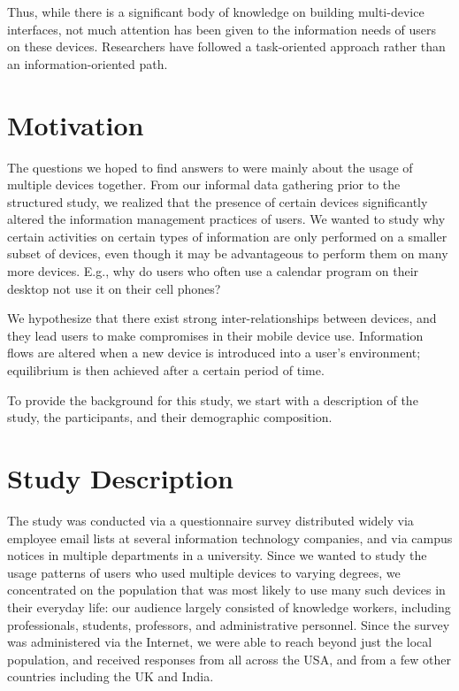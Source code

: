 \documentclass[twocolumn,final,10pt]{article}
\begin{document}
Thus, while there is a significant body of knowledge on building multi-device interfaces, not much attention has been given to the information needs of users on these devices. Researchers have followed a task-oriented approach rather than an in\-for\-ma\-tion-oriented path.

\section{Motivation}

The questions we hoped to find answers to were mainly about the usage of multiple devices together. From our informal data gathering prior to the structured study, we realized that the presence of certain devices significantly altered the information management practices of users. We wanted to study why certain activities on certain types of information are only performed on a smaller subset of devices, even though it may be advantageous to perform them on many more devices. E.g., why do users who often use a calendar program on their desktop not use it on their cell phones?

We hypothesize that there exist strong inter-relationships between devices, and they lead users to make compromises in their mobile device use. Information flows are altered when a new device is introduced into a user's environment; equilibrium is then achieved after a certain period of time.

To provide the background for this study, we start with a description of the study, the participants, and their demographic composition.

\section{Study Description}

The study was conducted via a questionnaire survey distributed widely via employee email lists at several information technology companies, and via campus notices in multiple departments in a university. Since we wanted to study the usage patterns of users who used multiple devices to varying degrees, we concentrated on the population that was most likely to use many such devices in their everyday life: our audience largely consisted of knowledge workers, including professionals, students, professors, and administrative personnel. Since the survey was administered via the Internet, we were able to reach beyond just the local population, and received responses from all across the USA, and from a few other countries including the UK and India.
\end{document}

